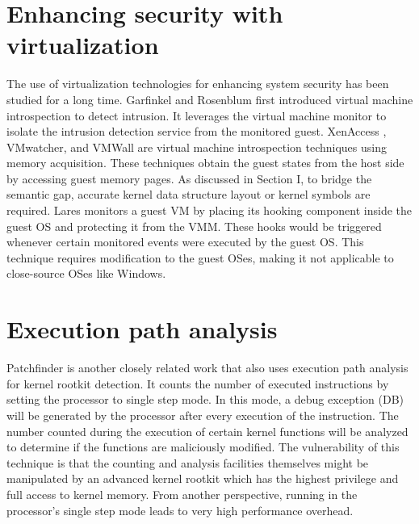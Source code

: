 \documentclass[12pt]{report}
\begin{document}
\section{Enhancing security with virtualization}
The use of virtualization technologies for enhancing system security has
been studied for a long time. Garfinkel and Rosenblum 
first introduced virtual machine introspection to detect intrusion.
It leverages the virtual machine monitor to isolate
the intrusion detection service from the monitored guest. XenAccess
, VMwatcher, and VMWall  are virtual
machine introspection techniques using memory acquisition.
These techniques obtain the guest states from the host side by
accessing guest memory pages. As discussed in Section I, to
bridge the semantic gap, accurate kernel data structure layout
or kernel symbols are required. Lares  monitors a guest
VM by placing its hooking component inside the guest OS and
protecting it from the VMM. These hooks would be triggered
whenever certain monitored events were executed by the guest
OS. This technique requires modification to the guest OSes,
making it not applicable to close-source OSes like Windows.

\section{Execution path analysis}
Patchfinder  is another
closely related work that also uses execution path analysis
for kernel rootkit detection. It counts the number of executed
instructions by setting the processor to single step mode. In
this mode, a debug exception (DB) will be generated by the
processor after every execution of the instruction. The number
counted during the execution of certain kernel functions will
be analyzed to determine if the functions are maliciously modified.
The vulnerability of this technique is that the counting
and analysis facilities themselves might be manipulated by
an advanced kernel rootkit which has the highest privilege
and full access to kernel memory. From another perspective,
running in the processor’s single step mode leads to very high
performance overhead.
\end{document}
